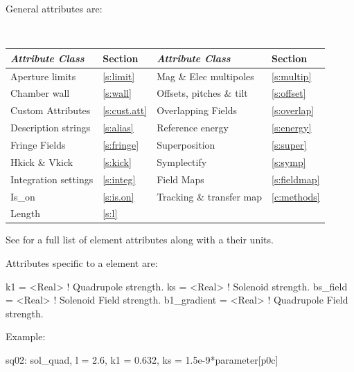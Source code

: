 {General  attributes are:
\begin{center}
\tt
\begin{tabular}{llll} \toprule
  {\sl Attribute Class}      & Section           & {\sl Attribute Class}      & Section            \\ \midrule
  Aperture limits            & \ref{s:limit}     & Mag \& Elec multipoles     & \ref{s:multip}     \\
  Chamber wall               & \ref{s:wall}      & Offsets, pitches \& tilt   & \ref{s:offset}     \\
  Custom Attributes          & \ref{s:cust.att}  & Overlapping Fields         & \ref{s:overlap}    \\
  Description strings        & \ref{s:alias}     & Reference energy           & \ref{s:energy}     \\ 
  Fringe Fields              & \ref{s:fringe}    & Superposition              & \ref{s:super}      \\
  Hkick \& Vkick             & \ref{s:kick}      & Symplectify                & \ref{s:symp}       \\
  Integration settings       & \ref{s:integ}     & Field Maps                 & \ref{s:fieldmap}   \\
  Is_on                      & \ref{s:is.on}     & Tracking \& transfer map   & \ref{c:methods}    \\ 
  Length                     & \ref{s:l}         &                            &                    \\ 
  \bottomrule
\end{tabular}
\end{center}
\toffset
See  for a full list of element attributes along with a their units.

Attributes specific to a  element are:
\begin{example}
  k1          = <Real>    ! Quadrupole strength.
  ks          = <Real>    ! Solenoid strength.
  bs_field    = <Real>    ! Solenoid Field strength.
  b1_gradient = <Real>    ! Quadrupole Field strength.
\end{example}

Example:
\begin{example}
  sq02: sol_quad, l = 2.6, k1 = 0.632, ks = 1.5e-9*parameter[p0c]
\end{example}

}
